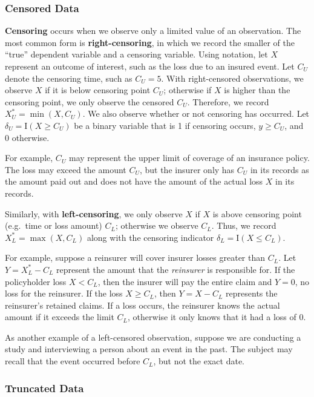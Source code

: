 \documentclass[]{book}
\theoremstyle{definition}
\theoremstyle{definition}
\theoremstyle{definition}
\theoremstyle{remark}
\begin{document}
\subsubsection{Censored Data}\label{censored-data}

\textbf{Censoring} occurs when we observe only a limited value of an
observation. The most common form is \textbf{right-censoring}, in which
we record the smaller of the ``true'' dependent variable and a censoring
variable. Using notation, let \(X\) represent an outcome of interest,
such as the loss due to an insured event. Let \(C_U\) denote the
censoring time, such as \(C_U=5\). With right-censored observations, we
observe \(X\) if it is below censoring point \(C_U\); otherwise if \(X\)
is higher than the censoring point, we only observe the censored
\(C_U\). Therefore, we record \(X_U^{\ast}= \min(X, C_U)\). We also
observe whether or not censoring has occurred. Let
\(\delta_U= \mathrm{I}(X \geq C_U)\) be a binary variable that is 1 if
censoring occurs, \(y \geq C_U\), and 0 otherwise.

For example, \(C_U\) may represent the upper limit of coverage of an
insurance policy. The loss may exceed the amount \(C_U\), but the
insurer only has \(C_U\) in its records as the amount paid out and does
not have the amount of the actual loss \(X\) in its records.

Similarly, with \textbf{left-censoring}, we only observe \(X\) if \(X\)
is above censoring point (e.g.~time or loss amount) \(C_L\); otherwise
we observe \(C_L\). Thus, we record \(X_L^{\ast}= \max(X, C_L)\) along
with the censoring indicator \(\delta_L= \mathrm{I}(X \leq C_L)\).

For example, suppose a reinsurer will cover insurer losses greater than
\(C_L\). Let \(Y = X_L^{\ast} - C_L\) represent the amount that the
\emph{reinsurer} is responsible for. If the policyholder loss
\(X < C_L\), then the insurer will pay the entire claim and \(Y =0\), no
loss for the reinsurer. If the loss \(X \ge C_L\), then \(Y = X-C_L\)
represents the reinsurer's retained claims. If a loss occurs, the
reinsurer knows the actual amount if it exceeds the limit \(C_L\),
otherwise it only knows that it had a loss of \(0\).

As another example of a left-censored observation, suppose we are
conducting a study and interviewing a person about an event in the past.
The subject may recall that the event occurred before \(C_L\), but not
the exact date.

\subsubsection{Truncated Data}\label{truncated-data}
\end{document}
